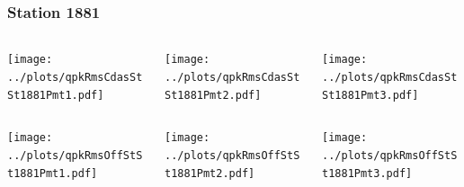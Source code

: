 \documentclass[aspectratio=169]{beamer}
\begin{document}
\begin{frame} 
  \frametitle{Station 1881}
  \begin{center}
    \begin{columns}
      \begin{column}{0.33\textwidth}
        \texttt{[image: ../plots/qpkRmsCdasStSt1881Pmt1.pdf]}
      \end{column}
      \begin{column}{0.33\textwidth}
        \texttt{[image: ../plots/qpkRmsCdasStSt1881Pmt2.pdf]}
      \end{column}
      \begin{column}{0.33\textwidth}
        \texttt{[image: ../plots/qpkRmsCdasStSt1881Pmt3.pdf]}
      \end{column}
    \end{columns}
  \end{center}

  \begin{center}
    \begin{columns}
      \begin{column}{0.33\textwidth}
        \texttt{[image: ../plots/qpkRmsOffStSt1881Pmt1.pdf]}
      \end{column}
      \begin{column}{0.33\textwidth}
        \texttt{[image: ../plots/qpkRmsOffStSt1881Pmt2.pdf]}
      \end{column}
      \begin{column}{0.33\textwidth}
        \texttt{[image: ../plots/qpkRmsOffStSt1881Pmt3.pdf]}
      \end{column}
    \end{columns}
  \end{center}
\end{frame}
\end{document}
